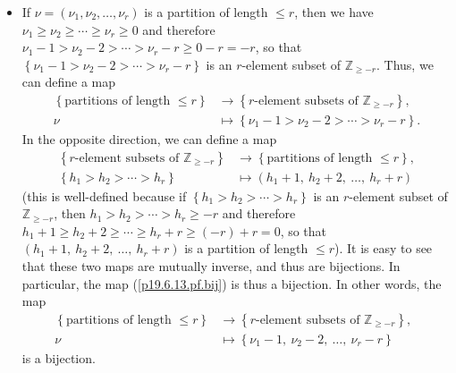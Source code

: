 \documentclass[numbers=enddot,12pt,final,onecolumn,notitlepage]{scrartcl}%
\theoremstyle{definition}
\begin{document}
\begin{enumerate}
\begin{itemize}
\item If $\nu=\left(  \nu_{1},\nu_{2},\ldots,\nu_{r}\right)  $ is a partition
of length $\leq r$, then we have $\nu_{1}\geq\nu_{2}\geq\cdots\geq\nu_{r}%
\geq0$ and therefore $\nu_{1}-1>\nu_{2}-2>\cdots>\nu_{r}-r\geq0-r=-r$, so that
$\left\{  \nu_{1}-1>\nu_{2}-2>\cdots>\nu_{r}-r\right\}  $ is an $r$-element
subset of $\mathbb{Z}_{\geq-r}$. Thus, we can define a map%
\begin{align}
\left\{  \text{partitions of length }\leq r\right\}   &  \rightarrow\left\{
r\text{-element subsets of }\mathbb{Z}_{\geq-r}\right\}  ,\nonumber\\
\nu &  \mapsto\left\{  \nu_{1}-1>\nu_{2}-2>\cdots>\nu_{r}-r\right\}  .
\label{p19.6.13.pf.bij}%
\end{align}
In the opposite direction, we can define a map%
\begin{align*}
\left\{  r\text{-element subsets of }\mathbb{Z}_{\geq-r}\right\}   &
\rightarrow\left\{  \text{partitions of length }\leq r\right\}  ,\\
\left\{  h_{1}>h_{2}>\cdots>h_{r}\right\}   &  \mapsto\left(  h_{1}%
+1,\ h_{2}+2,\ \ldots,\ h_{r}+r\right)
\end{align*}
(this is well-defined because if $\left\{  h_{1}>h_{2}>\cdots>h_{r}\right\}  $
is an $r$-element subset of $\mathbb{Z}_{\geq-r}$, then $h_{1}>h_{2}%
>\cdots>h_{r}\geq-r$ and therefore $h_{1}+1\geq h_{2}+2\geq\cdots\geq
h_{r}+r\geq\left(  -r\right)  +r=0$, so that $\left(  h_{1}+1,\ h_{2}%
+2,\ \ldots,\ h_{r}+r\right)  $ is a partition of length $\leq r$). It is easy
to see that these two maps are mutually inverse, and thus are bijections. In
particular, the map (\ref{p19.6.13.pf.bij}) is thus a bijection. In other
words, the map%
\begin{align}
\left\{  \text{partitions of length }\leq r\right\}   &  \rightarrow\left\{
r\text{-element subsets of }\mathbb{Z}_{\geq-r}\right\}  ,\nonumber\\
\nu &  \mapsto\left\{  \nu_{1}-1,\ \nu_{2}-2,\ \ldots,\ \nu_{r}-r\right\}
\ \ \ \ \ \ \ \ \ \label{p19.6.13.pf.bij2}%
\end{align}
is a bijection.
\end{itemize}


\end{enumerate}
\end{document}
